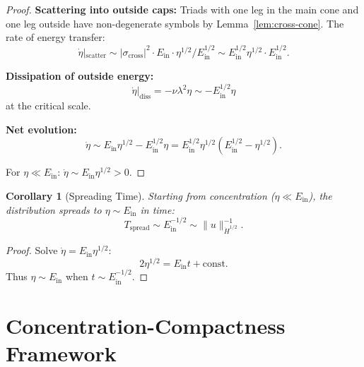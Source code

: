 \documentclass[11pt]{article}
\newtheorem{corollary}[theorem]{Corollary}
\theoremstyle{definition}
\begin{document}
\begin{proof}
\textbf{Scattering into outside caps:} Triads with one leg in the main cone and one leg outside have non-degenerate symbols by Lemma~\ref{lem:cross-cone}. The rate of energy transfer:
\begin{equation}
\dot{\eta}|_{\text{scatter}} \sim |\sigma_{\text{cross}}|^2 \cdot E_{\text{in}} \cdot \eta^{1/2}/E_{\text{in}}^{1/2} \sim E_{\text{in}}^{1/2} \eta^{1/2} \cdot E_{\text{in}}^{1/2}.
\end{equation}

\textbf{Dissipation of outside energy:}
\begin{equation}
\dot{\eta}|_{\text{diss}} = -\nu \lambda^2 \eta \sim -E_{\text{in}}^{1/2} \eta
\end{equation}
at the critical scale.

\textbf{Net evolution:}
\begin{equation}
\dot{\eta} \sim E_{\text{in}} \eta^{1/2} - E_{\text{in}}^{1/2} \eta = E_{\text{in}}^{1/2} \eta^{1/2}(E_{\text{in}}^{1/2} - \eta^{1/2}).
\end{equation}

For $\eta \ll E_{\text{in}}$: $\dot{\eta} \sim E_{\text{in}} \eta^{1/2} > 0$.
\end{proof}

\begin{corollary}[Spreading Time]\label{cor:spread-time}
Starting from concentration ($\eta \ll E_{\text{in}}$), the distribution spreads to $\eta \sim E_{\text{in}}$ in time:
\begin{equation}
T_{\text{spread}} \sim E_{\text{in}}^{-1/2} \sim \|u\|_{\dot{H}^{1/2}}^{-1}.
\end{equation}
\end{corollary}

\begin{proof}
Solve $\dot{\eta} = E_{\text{in}} \eta^{1/2}$:
\begin{equation}
2\eta^{1/2} = E_{\text{in}} t + \text{const}.
\end{equation}
Thus $\eta \sim E_{\text{in}}$ when $t \sim E_{\text{in}}^{-1/2}$.
\end{proof}

\section{Concentration-Compactness Framework}\label{sec:cc}
\end{document}
